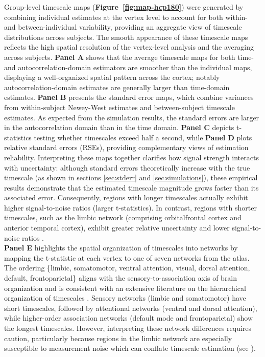 \documentclass[docs/main.tex]{subfiles}
\begin{document}
Group-level timescale maps (\textbf{Figure~\ref{fig:map-hcp180}}) were generated by combining individual estimates at the vertex level to account for both within- and between-individual variability, providing an aggregate view of timescale distributions across subjects. The smooth appearance of these timescale maps reflects the high spatial resolution of the vertex-level analysis and the averaging across subjects. \textbf{Panel A} shows that the average timescale maps for both time- and autocorrelation-domain estimators are smoother than the individual maps, displaying a well-organized spatial pattern across the cortex; notably autocorrelation-domain estimates are generally larger than time-domain estimates. \textbf{Panel B} presents the standard error maps, which combine variances from within-subject Newey-West estimates and between-subject timescale estimates. As expected from the simulation results, the standard errors are larger in the autocorrelation domain than in the time domain. \textbf{Panel C} depicts t-statistics testing whether timescales exceed half a second, while \textbf{Panel D} plots relative standard errors (RSEs), providing complementary views of estimation reliability. Interpreting these maps together clarifies how signal strength interacts with uncertainty: although standard errors theoretically increase with the true timescale (as shown in sections \ref{sec:stderr} and \ref{sec:simulations}), these empirical results demonstrate that the estimated timescale magnitude grows faster than its associated error. Consequently, regions with longer timescales actually exhibit higher signal-to-noise ratios (larger t-statistics). In contrast, regions with shorter timescales, such as the limbic network (comprising orbitalfrontal cortex and anterior temporal cortex), exhibit greater relative uncertainty and lower signal-to-noise ratios \citep{thomas_yeo_organization_2011, du_organization_2024}.\\

\textbf{Panel E} highlights the spatial organization of timescales into networks by mapping the t-statistic at each vertex to one of seven networks from the \citet{thomas_yeo_organization_2011} atlas. The ordering \{limbic, somatomotor, ventral attention, visual, dorsal attention, default, frontoparietal\} aligns with the sensory-to-association axis of brain organization and is consistent with an extensive literature on the hierarchical organization of timescales \citep{murray_hierarchy_2014, stephens_place_2013, raut_hierarchical_2020, gao_neuronal_2020, hasson_hierarchy_2008}. Sensory networks (limbic and somatomotor) have short timescales, followed by attentional networks (ventral and dorsal attention), while higher-order association networks (default mode and frontoparietal) show the longest timescales. However, interpreting these network differences requires caution, particularly because regions in the limbic network are especially susceptible to measurement noise which can conflate timescale estimation (see ).\\
\end{document}
